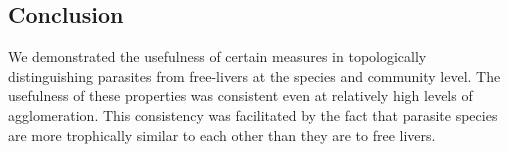 \documentclass[/home/nkappler/Research/Dissertation/dissertation.tex]{subfiles}
\begin{document}
\begin{bibunit}
\section{Conclusion} We demonstrated the usefulness of certain measures in
topologically distinguishing parasites from free-livers at the species and
community level. The usefulness of these properties was consistent even at
relatively high levels of agglomeration. This consistency was facilitated by
the fact that parasite species are more trophically similar to each other than
they are to free livers.

\clearpage
{}
\putbib
\end{bibunit} 
\end{document}
